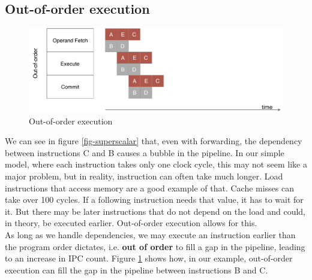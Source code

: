\documentclass[12pt,a4paper]{article} %
\begin{document}
\subsection{Out-of-order execution}
\begin{figure}[H]
	\centering
	\includegraphics[width=\textwidth]{Source/SchedulingSchemes/Out-of-order.pdf}
	\caption{Out-of-order execution} 
	\label{fig-out-of-order}
\end{figure}
We can see in figure \ref{fig-superscalar} that, even with forwarding, the dependency between instructions C and B causes a bubble in the pipeline. In our simple model, where each instruction takes only one clock cycle, this may not seem like a major problem, but in reality, instruction can often take much longer. Load instructions that access memory are a good example of that. Cache misses can take over 100 cycles. If a following instruction needs that value, it has to wait for it. But there may be later instructions that do not depend on the load and could, in theory, be executed earlier. Out-of-order execution allows for this. \\
As long as we handle dependencies, we may execute an instruction earlier than the program order dictates, i.e. \textbf{out of order} to fill a gap in the pipeline, leading to an increase in IPC count. Figure \ref{fig-out-of-order} shows how, in our example, out-of-order execution can fill the gap in the pipeline between instructions B and C.\\




\newpage
\end{document}
